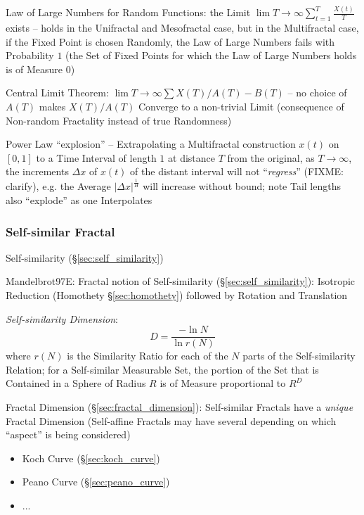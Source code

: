 Law of Large Numbers for Random Functions: the Limit
$\lim T \to \infty \sum_{t=1}^T \frac{X(t)}{T}$ exists -- holds in the
Unifractal and Mesofractal case, but in the Multifractal case, if the Fixed
Point is chosen Randomly, the Law of Large Numbers fails with Probability $1$
(the Set of Fixed Points for which the Law of Large Numbers holds is of Measure
$0$)

Central Limit Theorem: $\lim T \to \infty \sum X(T)/A(T) - B(T)$ -- no choice of
$A(T)$ makes $X(T)/A(T)$ Converge to a non-trivial Limit (consequence of
Non-random Fractality instead of true Randomness)

Power Law ``explosion'' -- Extrapolating a Multifractal construction $x(t)$ on
$[0, 1]$ to a Time Interval of length $1$ at distance $T$ from the original, as
$T \to \infty$, the increments $\Delta x$ of $x(t)$ of the distant interval will
not ``\emph{regress}'' (FIXME: clarify), e.g. the Average
$|\Delta x|^\frac{1}{H}$ will increase without bound; note Tail lengths also
``explode'' as one Interpolates



\subsubsection{Self-similar Fractal}\label{sec:selfsimilar_fractal}

Self-similarity (\S\ref{sec:self_similarity})

Mandelbrot97E: Fractal notion of Self-similarity (\S\ref{sec:self_similarity}):
Isotropic Reduction (Homothety \S\ref{sec:homothety}) followed by Rotation and
Translation

\emph{Self-similarity Dimension}:
\[
  D = \frac{-\ln N}{\ln r(N)}
\]
where $r(N)$ is the Similarity Ratio for each of the $N$ parts of the
Self-similarity Relation; for a Self-similar Measurable Set, the portion of the
Set that is Contained in a Sphere of Radius $R$ is of Measure proportional to
$R^D$

Fractal Dimension (\S\ref{sec:fractal_dimension}): Self-similar Fractals have a
\emph{unique} Fractal Dimension (Self-affine Fractals may have several depending
on which ``aspect'' is being considered)

\begin{itemize}
  \item Koch Curve (\S\ref{sec:koch_curve})
  \item Peano Curve (\S\ref{sec:peano_curve})
  \item ...
\end{itemize}



